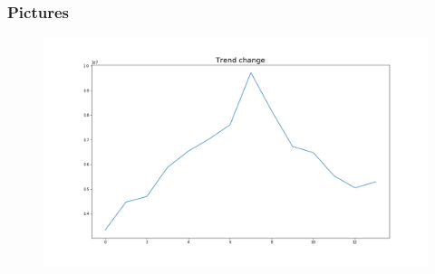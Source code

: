 \documentclass[intlimits, 9pt, unicode]{beamer}
\begin{document}
\begin{frame}
\frametitle{Pictures}
\begin{figure}
\includegraphics[scale=0.30]{images/001_trend_change}
\end{figure}
\end{frame}
\end{document}
